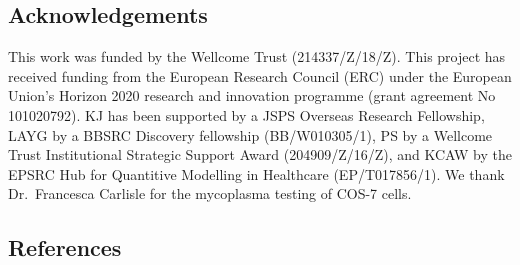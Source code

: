 \documentclass[
  10pt,
  onecolumn]{article}
\begin{document}
\hypertarget{acknowledgements}{%
\subsection{Acknowledgements}\label{acknowledgements}}

This work was funded by the Wellcome Trust (214337/Z/18/Z). This project
has received funding from the European Research Council (ERC) under the
European Union's Horizon 2020 research and innovation programme (grant
agreement No 101020792). KJ has been supported by a JSPS Overseas
Research Fellowship, LAYG by a BBSRC Discovery fellowship
(BB/W010305/1), PS by a Wellcome Trust Institutional Strategic Support
Award (204909/Z/16/Z), and KCAW by the EPSRC Hub for Quantitive
Modelling in Healthcare (EP/T017856/1). We thank Dr.~Francesca Carlisle
for the mycoplasma testing of COS-7 cells.

\hypertarget{references}{%
\subsection*{References}\label{references}}
\end{document}

